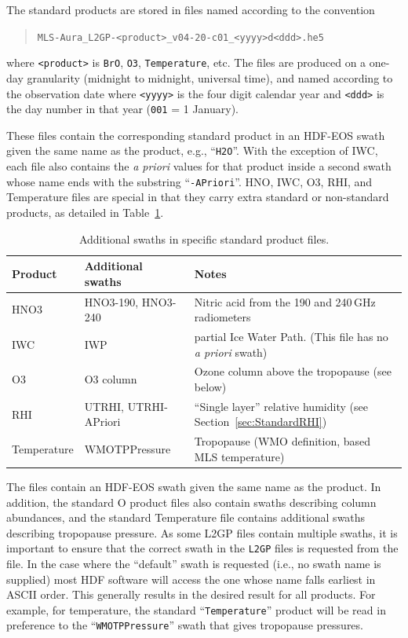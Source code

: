 \documentclass[11pt,draft]{report}
\begin{document}
The standard products are stored in files named according to the convention
\begin{quote}
\verb+MLS-Aura_L2GP-<product>_v04-20-c01_<yyyy>d<ddd>.he5+
\end{quote}
where \verb+<product>+ is \texttt{BrO}, \texttt{O3},
\texttt{Temperature}, etc.  The files are produced on a one-day
granularity (midnight to midnight, universal time), and named according
to the observation date where \verb+<yyyy>+ is the four digit calendar
year and \verb+<ddd>+ is the day number in that year (\texttt{001} = 1
January).

These files contain the corresponding standard product in an HDF-EOS
swath given the same name as the product, e.g., ``\texttt{H2O}''.  With the
exception of IWC, each file also contains the \emph{a priori} values for that
product inside a second swath whose name ends with the substring
``\texttt{-APriori}''. HNO, IWC, O3, RHI, and Temperature files are special in
that they carry extra standard or non-standard products, as detailed in
Table~\ref{tab:SwathExtras}.

\begin{table}
  \caption{Additional swaths in specific standard product
    files.\label{tab:SwathExtras}}\small
\begin{center}
\begin{tabular}{>{\ttfamily}l>{\ttfamily}ll}
  \toprule
  \textbf{\rmfamily Product} & \textbf{\rmfamily Additional swaths} &
  \textbf{\rmfamily Notes} \\
  \midrule
  HNO3 & HNO3-190, HNO3-240 & Nitric acid from the 190 and
  240\,GHz radiometers\\
  IWC & IWP & partial Ice Water Path.  (This file has no \emph{a priori} swath) \\
  O3 & O3 column & Ozone column above the tropopause (see below) \\
  RHI & UTRHI, UTRHI-APriori & ``Single layer'' relative humidity (see Section~\ref{sec:StandardRHI})\\
  Temperature & WMOTPPressure & Tropopause (WMO definition, based MLS
  temperature) \\
  \bottomrule
\end{tabular}
\end{center}
\end{table}

The files contain an HDF-EOS swath given the same name as the product.
In addition, the standard O product files also contain swaths
describing column abundances, and the standard Temperature file contains
additional swaths describing tropopause pressure.  As some L2GP files
contain multiple swaths, it is important to ensure that the correct
swath in the \texttt{L2GP} files is requested from the file.  In the
case where the ``default'' swath is requested (i.e., no swath name is
supplied) most HDF software will access the one whose name falls
earliest in ASCII order.  This generally results in the desired result
for all products.  For example, for temperature, the standard
``\texttt{Temperature}'' product will be read in preference to the
``\texttt{WMOTPPressure}'' swath that gives tropopause pressures.
\end{document}
